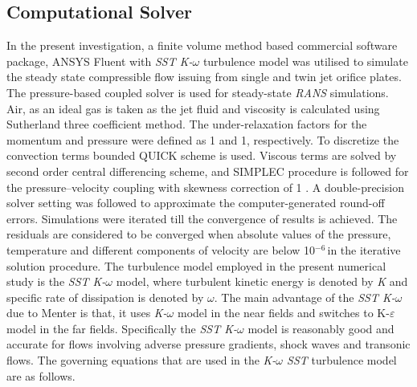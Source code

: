 \documentclass[Afour,sagev,times]{sagej}
\begin{document}
\subsection{Computational Solver}
In the present investigation, a finite volume method \cite{anderson1995computational} based commercial software package, ANSYS Fluent with \textit{SST K-$\omega$} turbulence model was utilised to simulate the steady state compressible flow issuing from single and twin jet orifice plates. The pressure-based coupled solver is used for steady-state \textit{RANS} simulations. Air, as an ideal gas is taken as the jet fluid and viscosity is calculated using Sutherland three coefficient method. The under-relaxation factors for the momentum and pressure were defined as 1 and 1, respectively. To discretize the convection terms bounded QUICK scheme \cite{leonard1979stable} is used. Viscous terms are solved by second order central differencing scheme, and SIMPLEC procedure is followed for the pressure--velocity coupling with skewness correction of 1 \cite{patankar2018numerical}. A double-precision solver setting was followed to approximate the computer-generated round-off errors. Simulations were iterated till the convergence of results is achieved.  The residuals are considered to be converged when absolute values of the pressure, temperature and different components of velocity are below 10${}^{-6\ }$in the iterative solution procedure. The turbulence model employed in the present numerical study is the \textit{SST K-$\omega$} model, where turbulent kinetic energy is denoted by \textit{K} and specific rate of dissipation is denoted by \textit{$\omega$}. The main advantage of the \textit{SST K-$\omega$} due to Menter \cite{menter1994two} is that, it uses \textit{K-$\omega$} model in the near fields and switches to K-$\varepsilon$ model in the far fields. Specifically the \textit{SST K-$\omega$} model is reasonably good and accurate for flows involving adverse pressure gradients, shock waves and transonic flows. The governing equations that are used in the \textit{K-$\omega$ SST} turbulence model are as follows. 
\end{document}
